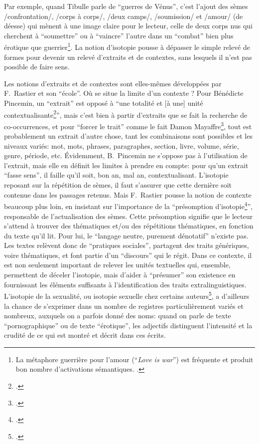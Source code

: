 Par exemple, quand Tibulle parle de \enquote{guerres de Vénus}, c'est l'ajout des sèmes /confrontation/, /corps à corps/, /deux camps/, /soumission/ et /amour/ (de déesse) qui mènent à une image claire pour le lecteur, celle de deux corps nus qui cherchent à \enquote{soumettre} ou à \enquote{vaincre} l'autre dans un \enquote{combat} bien plus érotique que guerrier\footnote{La métaphore guerrière pour l'amour (\enquote{\textit{Love is war}}) est fréquente et produit bon nombre d'activations sémantiques. \textcite{lakoff_metaphors_2003}.}. La notion d'isotopie pousse à dépasser le simple relevé de formes pour devenir un relevé d'extraits et de contextes, sans lesquels il n'est pas possible de faire sens.

Les notions d'extraits et de contextes sont elles-mêmes développées par F.~Rastier et son \enquote{école}. Où se situe la limite d'un contexte ? Pour Bénédicte Pincemin, un \enquote{extrait} est opposé à \enquote{une totalité et [à une] unité contextualisante\footcite{pincemin1999semantique}}, mais c'est bien à partir d'extraits que se fait la recherche de co-occurrences, et pour \enquote{forcer le trait} comme le fait Damon Mayaffre\footcite{mayaffre2008occurrence}, tout est probablement un extrait d'autre chose, tant les combinaisons sont possibles et les niveaux variés: mot, mots, phrases, paragraphes, section, livre, volume, série, genre, période, etc. Évidemment, B.~Pincemin ne s'oppose pas à l'utilisation de l'extrait, mais elle en définit les limites à prendre en compte: pour qu'un extrait \enquote{fasse sens}, il faille qu'il soit, bon an, mal an, contextualisant. L'isotopie reposant sur la répétition de sèmes, il faut s'assurer que cette dernière soit contenue dans les passages retenus. Mais F.~Rastier pousse la notion de contexte beaucoup plus loin, en insistant sur l'importance de la \enquote{présomption d'isotopie\footcite{rastier_isotopie_1985}}, responsable de l'actualisation des sèmes. Cette présomption signifie que le lecteur s'attend à trouver des thématiques et/ou des répétitions thématiques, en fonction du texte qu'il lit. Pour lui, le \enquote{langage neutre, purement dénotatif} n'existe pas. Les textes relèvent donc de \enquote{pratiques sociales}, partagent des traits génériques, voire thématiques, et font partie d'un \enquote{discours} qui le régit. Dans ce contexte, il est non seulement important de relever les unités textuelles qui, ensemble, permettent de déceler l'isotopie, mais d'aider à \enquote{présumer} son existence en fournissant les éléments suffisants à l'identification des traits extralinguistiques.  L'isotopie de la sexualité, ou isotopie sexuelle chez certains auteurs\footcite{leon_semes_1976}, a d'ailleurs la chance de s'exprimer dans un nombre de registres particulièrement variés et nombreux, auxquels on a parfois donné des noms: quand on parle de texte \enquote{pornographique} ou de texte \enquote{érotique}, les adjectifs distinguent l'intensité et la crudité de ce qui est montré et décrit dans ces écrits.

